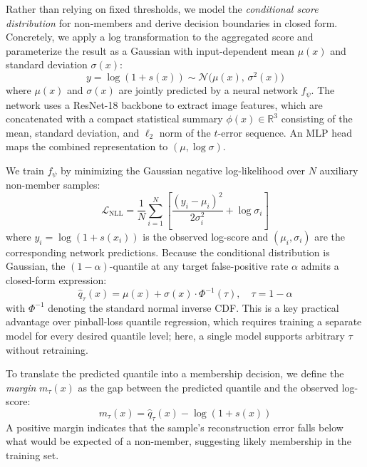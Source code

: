 \documentclass[sigconf, review, anonymous]{acmart}
\begin{document}
Rather than relying on fixed thresholds, we model the \emph{conditional score distribution} for non-members and derive decision boundaries in closed form. Concretely, we apply a log transformation to the aggregated score and parameterize the result as a Gaussian with input-dependent mean $\mu(x)$ and standard deviation $\sigma(x)$:
\begin{equation}
y = \log(1 + s(x)) \sim \mathcal{N}\!\bigl(\mu(x),\, \sigma^2(x)\bigr)
\end{equation}
where $\mu(x)$ and $\sigma(x)$ are jointly predicted by a neural network $f_\psi$. The network uses a ResNet-18 backbone to extract image features, which are concatenated with a compact statistical summary $\phi(x) \in \mathbb{R}^3$ consisting of the mean, standard deviation, and $\ell_2$ norm of the $t$-error sequence. An MLP head maps the combined representation to $(\mu, \log\sigma)$.

We train $f_\psi$ by minimizing the Gaussian negative log-likelihood over $N$ auxiliary non-member samples:
\begin{equation}
\mathcal{L}_{\text{NLL}} = \frac{1}{N}\sum_{i=1}^{N}\left[\frac{(y_i - \mu_i)^2}{2\sigma_i^2} + \log\sigma_i\right]
\end{equation}
where $y_i = \log(1 + s(x_i))$ is the observed log-score and $(\mu_i, \sigma_i)$ are the corresponding network predictions. Because the conditional distribution is Gaussian, the $(1{-}\alpha)$-quantile at any target false-positive rate $\alpha$ admits a closed-form expression:
\begin{equation}
\hat{q}_\tau(x) = \mu(x) + \sigma(x) \cdot \Phi^{-1}(\tau), \quad \tau = 1 - \alpha
\end{equation}
with $\Phi^{-1}$ denoting the standard normal inverse CDF. This is a key practical advantage over pinball-loss quantile regression, which requires training a separate model for every desired quantile level; here, a single model supports arbitrary $\tau$ without retraining.

To translate the predicted quantile into a membership decision, we define the \emph{margin} $m_\tau(x)$ as the gap between the predicted quantile and the observed log-score:
\begin{equation}
m_\tau(x) = \hat{q}_\tau(x) - \log(1 + s(x))
\end{equation}
A positive margin indicates that the sample's reconstruction error falls below what would be expected of a non-member, suggesting likely membership in the training set.
\end{document}
